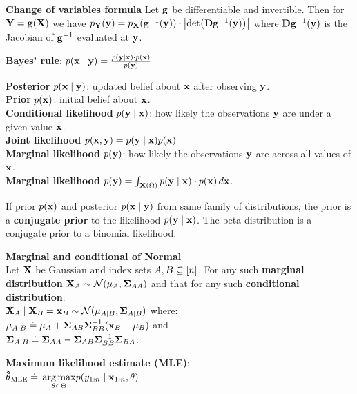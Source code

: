 \textbf{Change of variables formula}
Let $\mathbf{g}$ be differentiable and invertible. Then for $\mathbf{Y} = \mathbf{g}(\mathbf{X})$ we have $p_\rY(\vy) = p_\rX(\inv{\vg}(\vy)) \cdot \abs{\det{\jac \inv{\vg}(\vy)}}$ where $\mathbf{D} \mathbf{g}^{-1}(\mathbf{y})$ is the Jacobian of $\mathbf{g}^{-1}$ evaluated at $\mathbf{y}$.
\begin{framed}
\textbf{Bayes' rule}: 
$p(\mathbf{x} \mid \mathbf{y}) = \frac{p(\mathbf{y} \mid \mathbf{x}) \cdot p(\mathbf{x})}{p(\mathbf{y})}$
\end{framed}
\begin{framed}
    \textbf{Posterior} $p(\mathbf{x} \mid \mathbf{y})$: updated belief about $\mathbf{x}$ after observing $\mathbf{y}$. \\
    \textbf{Prior} $p(\mathbf{x})$: initial belief about $\mathbf{x}$. \\
    \textbf{Conditional likelihood} $p(\mathbf{y} \mid \mathbf{x})$: how likely the observations $\mathbf{y}$ are under a given value $\mathbf{x}$. \\
    \textbf{Joint likelihood} $p(\mathbf{x}, \mathbf{y}) = p(\mathbf{y} \mid \mathbf{x}) p(\mathbf{x})$ \\
    \textbf{Marginal likelihood} $p(\mathbf{y})$: how likely the observations $\mathbf{y}$ are across all values of $\mathbf{x}$. \\
    \textbf{Marginal likelihood} $p(\mathbf{y}) = \int_{\mathbf{X}(\Omega)} p(\mathbf{y} \mid \mathbf{x}) \cdot p(\mathbf{x}) \,d\mathbf{x}$. 
\end{framed}
If prior $p(\mathbf{x})$ and posterior $p(\mathbf{x} \mid \mathbf{y})$ from same family of distributions, the prior is a \textbf{conjugate prior} to the likelihood $p(\mathbf{y} \mid \mathbf{x})$. The beta distribution is a conjugate prior to a binomial likelihood. \\
\begin{framed}
    \textbf{Marginal and conditional of Normal} \\
    Let $\mathbf{X}$ be Gaussian and index sets $A, B \subseteq [n]$.
    For any such \textbf{marginal distribution} $\rX_A \sim \N{\vmu_\sA}{\mSigma_{\sA\sA}}$ and that for any such \textbf{conditional distribution}: \\
    $ \rX_\sA \mid \rX_\sB = \vx_\sB \sim \N{\vmu_{\sA \mid \sB}}{\mSigma_{\sA \mid \sB}}$ where: \\
        $\mathbf{\mu}_{A \mid B} \overset{.}{=} \mathbf{\mu}_A + \mathbf{\Sigma}_{AB}\mathbf{\Sigma}_{BB}^{-1}(\mathbf{x}_B - \mathbf{\mu}_B)$ and \\
        $\mathbf{\Sigma}_{A \mid B} \overset{.}{=} \mathbf{\Sigma}_{AA} - \mathbf{\Sigma}_{AB}\mathbf{\Sigma}_{BB}^{-1}\mathbf{\Sigma}_{BA}$.
\end{framed}
\textbf{Maximum likelihood estimate (MLE)}: \\
$\mathbf{\hat{\theta}}_{\mathrm{MLE}} \overset{.}{=}$
 $\underset{\mathbf{\theta} \in \Theta}{\operatorname*{arg\,max}} p(y_{1:n} \mid \mathbf{x}_{1:n}, \mathbf{\theta})$ \\
